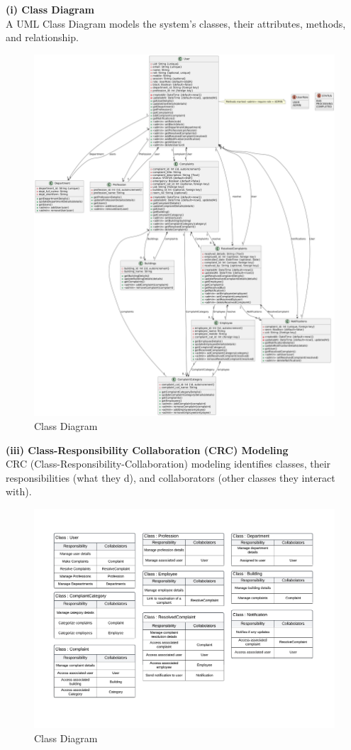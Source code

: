 \documentclass[a4paper,12pt]{article}
\begin{document}
 \noindent \textbf{(i) Class Diagram} \\
A UML Class Diagram models the system’s classes, their attributes, methods, and relationship.
\begin{figure}[H]
    \centering
    \includegraphics[width=1\linewidth]{photos/class-diagram}
    \caption{Class Diagram}
    \label{fig:enter-label}
\end{figure}

 \noindent \textbf{(iii) Class-Responsibility Collaboration (CRC) Modeling} \\
CRC (Class-Responsibility-Collaboration) modeling identifies classes, their responsibilities (what they d), and collaborators (other classes they interact with).
\begin{figure}[H]
    \centering
    \includegraphics[width=1\linewidth]{photos/crc.png}
    \caption{Class Diagram}
    \label{fig:enter-label}
\end{figure}
\end{document}
